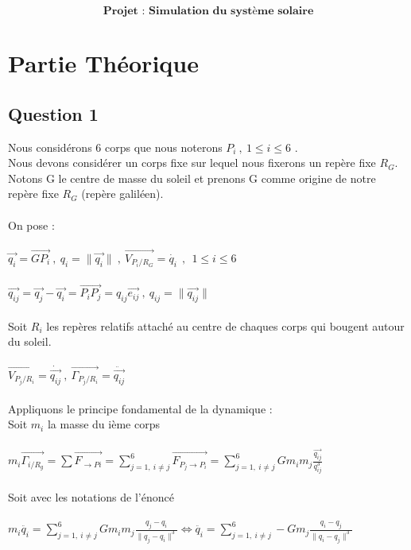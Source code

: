 \documentclass{article}
\begin{document}

$$ \textbf{Projet : Simulation~du~système~solaire}$$

\section{Partie Théorique} 
\subsection*{Question 1}
Nous considérons 6 corps que nous noterons $P_i~,~ 1 \leq i\leq 6 $ . \\
Nous devons considérer un corps fixe sur lequel nous fixerons un repère fixe $R_G $. Notons G le centre de masse du soleil et prenons G comme origine de notre repère fixe $R_G $ (repère galiléen).\\
\\
On pose : \\ \\
$ \vec{q_i} = \overrightarrow{GP_i}~,~{q_i} = \parallel\vec{q_i}\parallel~,~\overrightarrow{V_{P_i/R_G}}=\dot{q_i} ~~,~~ 1 \leq i\leq 6 $ \\ \\
$ \overrightarrow{q_{ij}} = \vec{q_j}-\vec{q_i} = \overrightarrow{P_iP_j} = q_{ij}\vec{e_{ij}} ~,~ q_{ij}=\parallel\overrightarrow{q_{ij}}\parallel$
\\ \\
Soit $R_i$ les repères relatifs attaché au centre de chaques corps qui bougent autour du soleil.\\ \\
$  \overrightarrow{V_{P_j/R_i}}=\dot{\overrightarrow{q_{ij}}} ~,~ \overrightarrow{\Gamma_{P_j/R_i}}=\ddot{\overrightarrow{q_{ij}}}$ \\ \\
Appliquons le principe fondamental de la dynamique : \\ Soit $m_i$ la masse du ième corps\\ \\
$ m_i\overrightarrow{\Gamma_{i/R_g}}=\sum\overrightarrow{F_{\to Pi}}=\sum\limits_{j=1,\ i\neq j}^6 \overrightarrow{F_{P_j \to P_i}}=\sum\limits_{j=1,\ i\neq j}^6 Gm_im_j \frac{\overrightarrow{q_{ij}}}{q_{ij}^3} $ \\ \\
Soit avec les notations de l'énoncé \\ \\
$ m_i\ddot{q_i}=\sum\limits_{j=1,\ i\neq j}^6 Gm_im_j \frac{q_j-q_i}{ \|q_j-q_i \|^3} \Longleftrightarrow \ddot{q_i}=\sum\limits_{j=1,\ i\neq j}^6 -Gm_j \frac{q_i-q_j}{ \|q_i-q_j \|^3}$\\  
\end{document}
